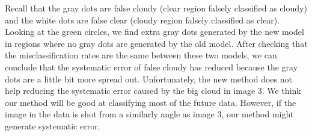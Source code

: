 \documentclass[jou]{apa}%
\begin{document}
Recall that the gray dots are false cloudy (clear region falsely classified as cloudy) and the white dots are false clear (cloudy region falsely classified as clear). Looking at the green circles, we find extra gray dots generated by the new model in regions where no gray dots are generated by the old model. After checking that the misclassification rates are the same between these two models, we can conclude that the systematic error of false cloudy has reduced because the gray dots are a little bit more spread out. Unfortunately, the new method does not help reducing the systematic error caused by the big cloud in image 3. We think our method will be good at classifying most of the future data. However, if the image in the data is shot from a similarly angle as image 3, our method might generate systematic error.
\end{document}
